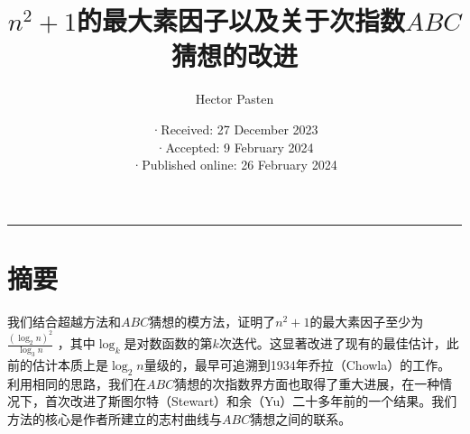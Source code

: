 \documentclass{article}
\title{\(n^{2}+1\)的最大素因子以及关于次指数\(ABC\)猜想的改进}
\author{Hector Pasten}
\date{·Received: 27 December 2023\\·Accepted: 9 February 2024\\·Published online: 26 February 2024}
\begin{document}
\maketitle
\thispagestyle{empty}
\newpage
\hrule

\part*{摘要}
\noindent
我们结合超越方法和\(ABC\)猜想的模方法，证明了\(n^{2}+1\)的最大素因子至少为\(\frac{(\log _{2}n)^{2}}{\log _{3}n}\) ，其中\(\log _{k}\)是对数函数的第\(k\)次迭代。这显著改进了现有的最佳估计，此前的估计本质上是\(\log _{2}n\)量级的，最早可追溯到1934年乔拉（Chowla）的工作。利用相同的思路，我们在\(ABC\)猜想的次指数界方面也取得了重大进展，在一种情况下，首次改进了斯图尔特（Stewart）和余（Yu）二十多年前的一个结果。我们方法的核心是作者所建立的志村曲线与\(ABC\)猜想之间的联系。
\end{document}
